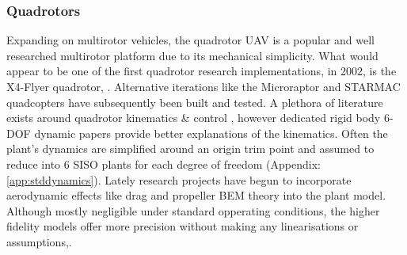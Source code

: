 \subsubsection*{Quadrotors}
Expanding on multirotor vehicles, the quadrotor UAV is a popular and well researched multirotor platform due to its mechanical simplicity. What would appear to be one of the first quadrotor research implementations, in 2002, is the X4-Flyer quadrotor, \cite{x4flyer,x4flyercontrol}. Alternative iterations like the Microraptor\cite{microraptor} and STARMAC\cite{starmac} quadcopters have subsequently been built and tested. A plethora of literature exists around quadrotor kinematics \& control \cite{dynamicmodelling2013, dynamicmodelling2009, modelingquadcopter, quaddynamics, fullquadcoptercontrol}, however dedicated rigid body 6-DOF dynamic papers \cite{rigidbodylecture,eulerrigidbody} provide better explanations of the kinematics. Often the plant's dynamics are simplified around an origin trim point and assumed to reduce into 6 SISO plants for each degree of freedom (Appendix:\ref{app:stddynamics}). Lately research projects have begun to incorporate aerodynamic effects like drag and propeller BEM theory into the plant model\cite{lowreynolds,bem,starmac}. Although mostly negligible under standard opperating conditions, the higher fidelity models offer more precision without making any linearisations or assumptions,\cite{nonlineardynamics,starmac}.
\par
